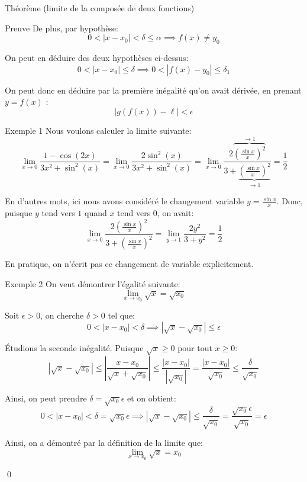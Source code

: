 \documentclass[a4paper]{article}
\begin{document}
\begin{parag}{Théorème (limite de la composée de deux fonctions)}
\begin{subparag}{Preuve}
        De plus, par hypothèse:
        \[0 < \left|x - x_0\right| < \delta \leq \alpha \implies f\left(x\right) \neq y_0\]

        On peut en déduire des deux hypothèses ci-dessus:
        \[0 < \left|x - x_0\right| \leq \delta \implies 0 < \left|f\left(x\right) - y_0\right| \leq \delta_1\]

        On peut donc en déduire par la première inégalité qu'on avait dérivée, en prenant $y = f\left(x\right)$ :
        \[\left|g\left(f\left(x\right)\right) - \ell\right| < \epsilon\]
    \end{subparag}

\end{parag}

\begin{parag}{Exemple 1}
    Nous voulons calculer la limite suivante:
    \[\lim_{x \to 0} \frac{1 - \cos\left(2x\right)}{3x^2 + \sin^2\left(x\right)} = \lim_{x \to 0} \frac{2 \sin^2\left(x\right)}{3x^2 + \sin^2\left(x\right)} = \lim_{x \to 0} \frac{2\overbrace{\left(\frac{\sin x}{x}\right)^2}^{\to 1}}{3 + \underbrace{\left(\frac{\sin x}{x}\right)^2}_{\to 1}} = \frac{1}{2}\]

    En d'autres mots, ici nous avons considéré le changement variable $y = \frac{\sin x}{x}$. Donc, puisque $y$ tend vers $1$ quand $x$ tend vers 0, on avait:
    \[\lim_{x \to 0} \frac{2\left(\frac{\sin x}{x}\right)^2}{3 + \left(\frac{\sin x}{x}\right)^2} = \lim_{y \to 1} \frac{2y^2}{3 + y^2} = \frac{1}{2}\]

    En pratique, on n'écrit pas ce changement de variable explicitement.
\end{parag}

\begin{parag}{Exemple 2}
    On veut démontrer l'égalité suivante:
    \[\lim_{x \to x_0} \sqrt{x} = \sqrt{x_0}\]

    Soit $\epsilon > 0$, on cherche $\delta > 0$ tel que:
    \[0 < \left|x - x_0\right| < \delta \implies \left|\sqrt{x} - \sqrt{x_0}\right| \leq \epsilon\]

    Étudions la seconde inégalité. Puisque $\sqrt{x} \geq 0$ pour tout $x \geq 0$:
    \[\left|\sqrt{x} - \sqrt{x_0}\right| \leq \left|\frac{x - x_0}{\sqrt{x} + \sqrt{x_0}}\right| \leq \frac{\left|x - x_0\right|}{\left|\sqrt{x_0}\right|} = \frac{\left|x - x_0\right|}{\sqrt{x_0}} \leq \frac{\delta}{\sqrt{x_0}}\]

    Ainsi, on peut prendre $\delta = \sqrt{x_0}\epsilon$ et on obtient:
    \[0 < \left|x - x_0\right| < \delta = \sqrt{x_0}\epsilon \implies \left|\sqrt{x} - \sqrt{x_0}\right| \leq \frac{\delta}{\sqrt{x_0}} = \frac{\sqrt{x_0}\epsilon}{\sqrt{x_0}} = \epsilon\]

    Ainsi, on a démontré par la définition de la limite que:
    \[\lim_{x \to x_0} \sqrt{x} = x_0\]

    \qed
\end{parag}
\end{document}
